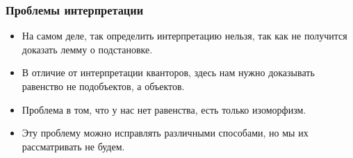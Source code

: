 \documentclass{beamer}
\theoremstyle{definition}
\begin{document}
\begin{frame}
\frametitle{Проблемы интерпретации}
\begin{itemize}
\item На самом деле, так определить интерпретацию нельзя, так как не получится доказать лемму о подстановке.
\item В отличие от интерпретации кванторов, здесь нам нужно доказывать равенство не подобъектов, а объектов.
\item Проблема в том, что у нас нет равенства, есть только изоморфизм.
\item Эту проблему можно исправлять различными способами, но мы их рассматривать не будем.
\end{itemize}
\end{frame}
\end{document}
